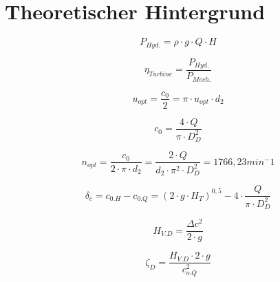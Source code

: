 \section{Theoretischer Hintergrund}

\begin{equation}
    P_{Hyd.} = \rho \cdot g \cdot Q \cdot H
    \label{eq:hydraulische_Leistung}
  \end{equation}

  \begin{equation}
    \eta_{Turbine} = \frac{P_{Hyd.}}{P_{Mech.}}
    \label{eq:Turbinenwirkungsgrad}
  \end{equation}

  \begin{equation}
    u_{opt} = \frac{c_{0}}{2}=\pi \cdot u_{opt} \cdot d_{2}
    \label{eq:umlaufgeschwindigkeit}
  \end{equation}

  \begin{equation}
    c_{0}=\frac{4 \cdot Q}{\pi \cdot D_{D}^2}
      \label{eq:austrittsgeschwindigkeit}
    \end{equation}
    
    
    \begin{equation}
     n_{opt}=\frac{c_{0}}{2 \cdot \pi \cdot d_{2}}=\frac{2 \cdot Q}{d_{2} \cdot \pi^2  \cdot D_{D}^2}=1766,23  min^-1
    \label{eq:n-optimal}
    \end{equation}

    \begin{equation}
        \delta_c = c_{0.H} - c_{0.Q} = ( 2\cdot g \cdot H_T)^{0,5} - 4\cdot \frac{Q}{\pi \cdot D_D^2}
    \end{equation}

    \begin{equation}
        H_{V.D} = \frac{\Delta c^2}{2\cdot g}
    \end{equation}
        
     \begin{equation}
        \zeta_D = \frac{H_{V.D} \cdot 2 \cdot g}{c_{o.Q}^2}
    \end{equation}